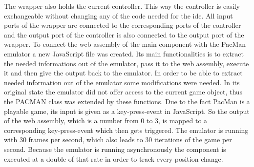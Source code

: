 The wrapper also holds the current controller. This way the controller is easily exchangeable without changing any of the code needed for the ide. All input ports of the wrapper are connected to the corresponding ports of the controller and the output port of the controller is also connected to the output port of the wrapper. \newline
To connect the web assembly of the main component with the PacMan emulator a new JavaScript file was created. Its main functionalities is to extract the needed informations out of the emulator, pass it to the web assembly, execute it and then give the output back to the emulator. In order to be able to extract needed information out of the emulator some modifications were needed. In its original state the emulator did not offer access to the current game object, thus the PACMAN class was extended by these functions. Due to the fact PacMan is a playable game, its input is given as a key-press-event in JavaScript. So the output of the web assembly, which is a number from 0 to 3, is mapped to a corresponding key-press-event which then gets triggered. The emulator is running with 30 frames per second, which also leads to 30 iterations of the game per second. Because the emulator is running asynchronously the component is executed at a double of that rate in order to track every position change.

